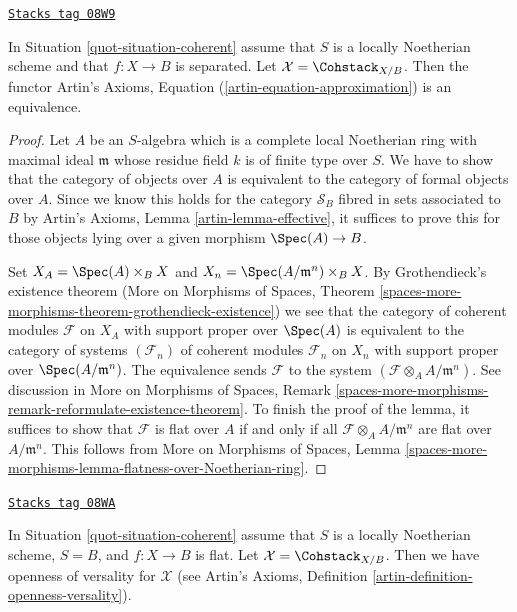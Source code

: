 \begin{lemma}
\label{quot-lemma-coherent-existence}
\href{https://stacks.math.columbia.edu/tag/08W9}{\texttt{Stacks tag 08W9}}

In Situation \ref{quot-situation-coherent} assume that $S$ is a locally Noetherian
scheme and that $f : X \to B$ is separated.
Let $\mathcal{X} = \Cohstack_{X/B}$. Then the functor
Artin's Axioms, Equation (\ref{artin-equation-approximation})
is an equivalence.
\end{lemma}

\begin{proof}
Let $A$ be an $S$-algebra which is a complete local Noetherian ring
with maximal ideal $\mathfrak m$
whose residue field $k$ is of finite type over $S$.
We have to show that the category of objects over $A$ is
equivalent to the category of formal objects over $A$.
Since we know this holds for the category $\mathcal{S}_B$
fibred in sets associated to $B$ by Artin's Axioms,
Lemma \ref{artin-lemma-effective}, it suffices to prove this
for those objects lying over a given morphism $\Spec(A) \to B$.

\medskip\noindent
Set $X_A = \Spec(A) \times_B X$ and $X_n = \Spec(A/\mathfrak m^n) \times_B X$.
By Grothendieck's existence theorem
(More on Morphisms of Spaces, Theorem
\ref{spaces-more-morphisms-theorem-grothendieck-existence})
we see that the category of coherent modules $\mathcal{F}$
on $X_A$ with support proper over $\Spec(A)$ is equivalent
to the category of systems $(\mathcal{F}_n)$ of coherent modules
$\mathcal{F}_n$ on $X_n$ with support proper over
$\Spec(A/\mathfrak m^n)$. The equivalence sends $\mathcal{F}$
to the system $(\mathcal{F} \otimes_A A/\mathfrak m^n)$. See discussion in
More on Morphisms of Spaces, Remark
\ref{spaces-more-morphisms-remark-reformulate-existence-theorem}.
To finish the proof of the lemma, it suffices to show that
$\mathcal{F}$ is flat over $A$ if and only if all
$\mathcal{F} \otimes_A A/\mathfrak m^n$ are flat over $A/\mathfrak m^n$.
This follows from
More on Morphisms of Spaces, Lemma
\ref{spaces-more-morphisms-lemma-flatness-over-Noetherian-ring}.
\end{proof}

\begin{lemma}
\label{quot-lemma-coherent-defo-thy}
\href{https://stacks.math.columbia.edu/tag/08WA}{\texttt{Stacks tag 08WA}}

In Situation \ref{quot-situation-coherent} assume that
$S$ is a locally Noetherian scheme, $S = B$, and $f : X \to B$ is flat.
Let $\mathcal{X} = \Cohstack_{X/B}$. Then we have openness of
versality for $\mathcal{X}$ (see
Artin's Axioms, Definition \ref{artin-definition-openness-versality}).
\end{lemma}

